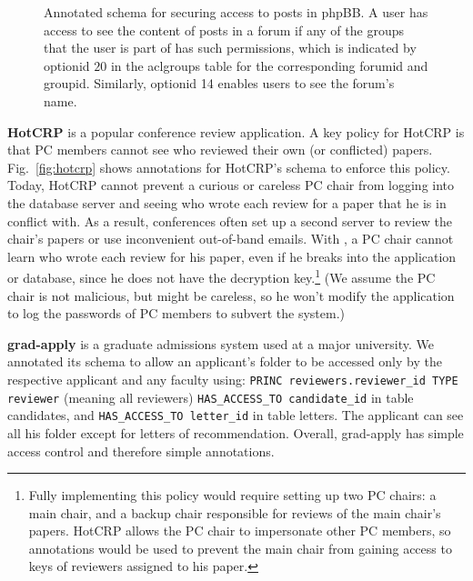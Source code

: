\begin{figure}[t!]
\begin{framed}
\begin{tabbing}
\end{tabbing}
\vspace{-0.15in}

\end{framed}

\vspace{-0.2in}
\caption{Annotated schema for securing access to posts in phpBB\@. A
  user has access to see the content of posts in a forum if any of the
  groups that the user is part of has such permissions, which is indicated
  by optionid $20$ in the aclgroups table for the corresponding forumid
  and groupid. Similarly, optionid 14 enables users to see the forum's
  name.}

\label{fig:posts}
\end{figure}


{\bf HotCRP} is a popular conference review application.  A key policy
for HotCRP is that PC members cannot see who reviewed their own (or
conflicted) papers.  Fig.~\ref{fig:hotcrp} shows \name annotations for
HotCRP's schema to enforce this policy.  Today, HotCRP cannot prevent
a curious or careless PC chair from logging into the database server
and seeing who wrote each review for a paper that he is in conflict
with.  As a result, conferences often set up a second server to review
the chair's papers or use inconvenient out-of-band emails.  With
\name, a PC chair cannot learn who wrote each review for his paper,
even if he breaks into the application or database, since he does not
have the decryption key.\footnote{Fully implementing this policy would
  require setting up two PC chairs: a main chair, and a backup chair
  responsible for reviews of the main chair's papers.  HotCRP allows
  the PC chair to impersonate other PC members, so \name annotations
  would be used to prevent the main chair from gaining access to keys
  of reviewers assigned to his paper.} (We assume the PC chair is not
malicious, but might be careless, so he won't modify the application
to log the passwords of PC members to subvert the system.)


{\bf grad-apply} is a graduate admissions system used at a major
university.  We annotated its schema to allow an applicant's folder to be accessed only by the respective applicant and any faculty using: 
 {\tt \small PRINC reviewers.reviewer\_id TYPE reviewer} (meaning all reviewers) {\tt \small HAS\_ACCESS\_TO candidate\_id} in table candidates, and {\tt \small HAS\_ACCESS\_TO letter\_id} in table letters. The applicant can see all his folder except for letters of recommendation.  Overall, grad-apply has simple access control and therefore simple
annotations. 


